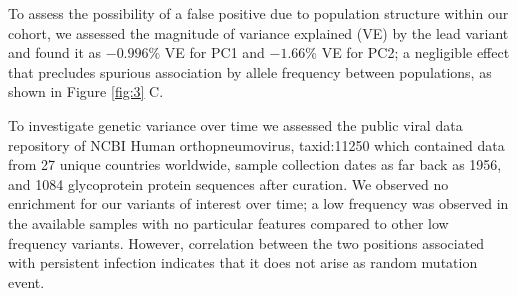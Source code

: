 \documentclass{article}
\begin{document}
To assess the possibility of a false positive due to population structure within our cohort,
we assessed the magnitude of variance explained (VE) by the lead variant and found it as 
$-0.996\%$ VE for PC1 and $-1.66\%$ VE for PC2; 
a negligible effect that precludes spurious association by allele frequency between populations, as shown in 
Figure \ref{fig:3} C.


To investigate genetic variance over time
we assessed the public viral data repository of NCBI Human orthopneumovirus, taxid:11250 which contained data from 
27 unique countries worldwide, sample collection dates as far back as 1956, and 1084 glycoprotein protein sequences after curation.
We observed no enrichment for our variants of interest over time; 
a low frequency was observed in the available samples with no particular features compared to other low frequency variants. 
However, correlation between the two positions associated with persistent infection indicates that it does not arise as random mutation event.

\end{document}
